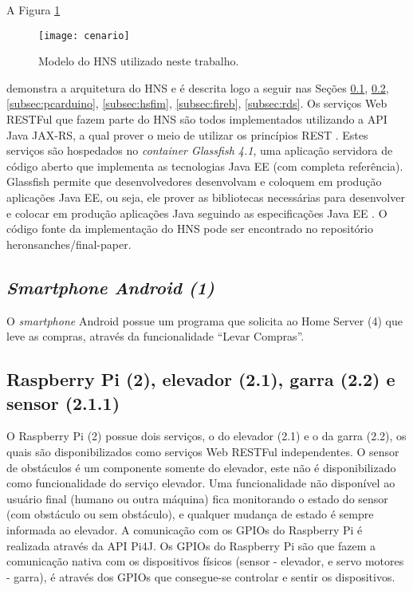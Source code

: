 A Figura \ref{fig:hnsworkmodel} 
\begin{figure}[!htb] \centering 
  \centering
  \texttt{[image: cenario]} 
  \caption{Modelo do HNS utilizado neste trabalho.} 
  \label{fig:hnsworkmodel}
\end{figure}
demonstra a arquitetura do HNS e é descrita logo a seguir nas Seções \ref{subsec:android}, \ref{subsec:rasp}, \ref{subsec:pcarduino}, \ref{subsec:hsfim}, \ref{subsec:fireb}, \ref {subsec:rds}. Os serviços Web RESTFul que fazem parte do HNS são todos implementados utilizando a API Java JAX-RS, a qual prover o meio de utilizar os princípios REST \cite{Heffelfinger:2014}. Estes serviços são hospedados no \textit{container Glassfish 4.1}, uma aplicação servidora de código aberto que implementa as tecnologias Java EE (com completa referência). Glassfish permite que desenvolvedores desenvolvam e coloquem em produção aplicações Java EE, ou seja, ele prover as bibliotecas necessárias para desenvolver e colocar em produção aplicações Java seguindo as especificações Java EE \cite{Heffelfinger:2014}. O código fonte da implementação do HNS pode ser encontrado no repositório heronsanches/final-paper\footnotemark {}.

\subsection{\textit{Smartphone Android (1)}}
\label{subsec:android}
O \textit{smartphone} Android possue um programa que solicita ao Home Server (4) que leve as compras, através da funcionalidade ``Levar Compras''.

\subsection{Raspberry Pi (2), elevador (2.1), garra (2.2) e sensor (2.1.1)}
\label{subsec:rasp}
O Raspberry Pi (2) possue dois serviços, o do elevador (2.1) e o da garra (2.2), os quais são disponibilizados como serviços Web RESTFul independentes. O sensor de obstáculos é um componente somente do elevador, este não é disponibilizado como funcionalidade do serviço elevador. Uma funcionalidade não disponível ao usuário final (humano ou outra máquina) fica monitorando o estado do sensor (com obstáculo ou sem obstáculo), e qualquer mudança de estado é sempre informada ao elevador. A comunicação com os GPIOs do Raspberry Pi é realizada através da API Pi4J\footnotemark {}. Os GPIOs do Raspberry Pi são que fazem a comunicação nativa com os dispositivos físicos (sensor - elevador, e servo motores - garra), é através dos GPIOs que consegue-se controlar e sentir os dispositivos.

